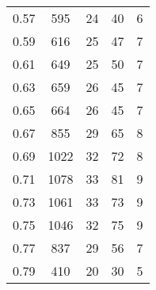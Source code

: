\begin{table}[h!]
\begin{minipage}{\textwidth}
\begin{center}
\begin{tabular}{c|c|c|c|c}
0.57  & 595  & 24  & 40  & 6\\
0.59  & 616  & 25  & 47  & 7\\
0.61  & 649  & 25  & 50  & 7\\
0.63  & 659  & 26  & 45  & 7\\
0.65  & 664  & 26  & 45  & 7\\
0.67  & 855  & 29  & 65  & 8\\
0.69  & 1022  & 32  & 72  & 8\\
0.71  & 1078  & 33  & 81  & 9\\
0.73  & 1061  & 33  & 73  & 9\\
0.75  & 1046  & 32  & 75  & 9\\
0.77  & 837  & 29  & 56  & 7\\
0.79  & 410  & 20  & 30  & 5\\
\hline \hline
\end{tabular}


\end{center}
\end{minipage}
\end{table}
